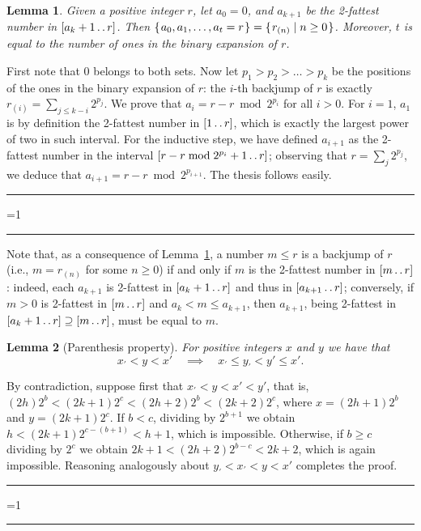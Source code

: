 \documentclass[a4paper]{article}
\newcounter{noqed}
\newcommand{\qed}{ \ifmmode\mbox{
}\fi\rule[-.05em]{.3em}{.7em}\setcounter{noqed}{0}}
\newenvironment{proof}[1][{}]{\noindent{\bf Proof#1.
}\setcounter{noqed}{1}}{\ifnum\value{noqed}=1\qed\fi\par\medskip}
\newtheorem{lemma}{Lemma}
\newcommand{\?}{\mskip1.5mu}
\def\..{\,\mathpunct{\ldotp\ldotp}} %
\begin{document}
\begin{lemma}
\label{lemma:twofateq}
	Given a positive integer $r$, let $a_0=0$, and $a_{k+1}$ be the 2-fattest
	number in $[a_k+1\..r]$. Then
	$\{\?a_0,a_1,\dots,a_t=r\?\}=\{\?r_{(n)} \mid n \geq 0\?\}$.
	Moreover, $t$ is equal to the number of ones in the binary expansion of $r$.
\end{lemma}
\begin{proof}
First note that $0$ belongs to both sets. Now let
$p_1>p_2>\dots>p_k$ be the positions of the ones in the binary expansion of $r$:
the $i$-th backjump of $r$ is exactly $r_{(i)}=\sum_{j\leq k-i}2^{p_j}$.
We prove that $a_i=r-r \bmod 2^{p_i}$ for all $i>0$. For $i=1$, $a_1$ is by definition the
2-fattest number in $[1\..r]$, which is exactly the largest power of two in such
interval. For the inductive step, we have defined $a_{i+1}$ as the 2-fattest
number in the interval $[r-r \bmod 2^{p_i}+1\..r]$; observing that $r=\sum_j
2^{p_j}$, we deduce that $a_{i+1}=r-r \bmod 2^{p_{i+1}}$. The thesis follows
easily.\qed
\end{proof}

Note that, as a consequence of Lemma~\ref{lemma:twofateq}, a number $m\leq r$ is a backjump of $r$
(i.e., $m=r_{(n)}$ for some $n\geq 0$) if and only if $m$ is the 2-fattest number in $[m\..r]$:
indeed, each $a_{k+1}$ is 2-fattest in $[a_k+1\..r]$ and thus in $[a_{k+1}\..r]$; conversely, if $m>0$ is 2-fattest 
in $[m\..r]$ and $a_k<m\leq a_{k+1}$, then $a_{k+1}$, being 2-fattest in $[a_k+1\..r]\supseteq[m\..r]$, must be equal to $m$.

\begin{lemma}[Parenthesis property]
\label{lemma:paren}
For positive integers $x$ and $y$ we have 
	that \[	x_\prime<y<x' \quad\implies\quad x_\prime\leq y_\prime < y'\leq x'.
	\]
\end{lemma}
\begin{proof}
By contradiction, suppose first that $x_\prime<y<x'<y'$, that is,
$(2h)2^b<(2k+1)2^c<(2h+2)2^b<(2k+2)2^c$, where $x=(2h+1)2^b$ and
$y=(2k+1)2^c$. If $b<c$, dividing by $2^{b+1}$ we obtain
$h < (2k+1)2^{c-(b+1)}<h+1$, which is impossible. Otherwise, if $b\geq c$
dividing by $2^c$ we obtain $2k+1<(2h+2)2^{b-c} < 2k+2$, which is again impossible. 
Reasoning analogously about $y_\prime<x_\prime<y<x'$ completes the
proof.\qed
\end{proof}
\end{document}
